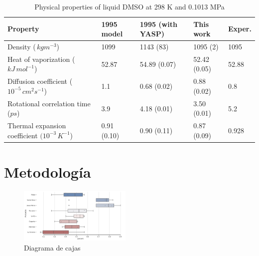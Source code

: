 \documentclass[11pt,letterpaper,twocolumn]{article}
\begin{document}
\begin{table}[tp]%
\begin{center}
\begin{tabular}{|l|l|l|l|l|}
\hline
Property    & 1995 model & 1995 (with YASP) & This work   & Exper. \\ \hline \hline
Density ($ \,kg m^{-3}$)    & 1099  & 1143 (83) & 1095 (2)     & 1095   \\ \hline
Heat of vaporization ($kJ \,mol^{-1}$)  & 52.87 & 54.89 (0.07)     & 52.42 (0.05) & 52.88  \\ \hline
Diffusion coefficient ($10^{-5} \, cm^{2} s^{-1}$) & 1.1 &  0.68 (0.02)        & 0.88 (0.02)  & 0.8    \\ \hline
Rotational correlation time ($ps$)  & 3.9     &    4.18 (0.01) & 3.50 (0.01)& 5.2    \\ \hline
Thermal expansion coefficient $(10^{-3} \,K^{-1}$)  & 0.91 (0.10) & 0.90 (0.11) & 0.87 (0.09) & 0.928  \\ \hline
\end{tabular}
	\end{center}
	\caption{Physical properties of liquid DMSO at 298 K and 0.1013 MPa}
	\label{tab:res}
\end{table}

\lipsum[1-2]
\section{Metodología}
\lipsum[3-4]
\begin{figure}[ht]
    \centering
    \includegraphics[width=0.48\textwidth]{figuras/Mercados.pdf} 
    \caption{Diagrama de cajas}
    \label{fig:caja}
\end{figure}
\lipsum[5]
\end{document}
